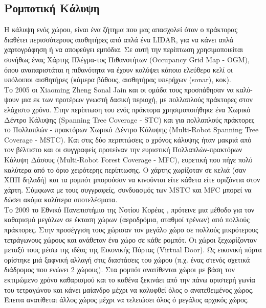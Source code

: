 \subsection{Ρομποτική Κάλυψη}

	Η κάλυψη ενός χώρου, είναι ένα ζήτημα που μας απασχολεί όταν ο πράκτορας διαθέτει περισσότερους αισθητήρες από απλά ένα LIDAR, για να κάνει απλά χαρτογράφηση ή να αποφεύγει εμπόδια. Σε αυτή την περίπτωση χρησιμοποιείται συνήθως ένας Χάρτης Πλέγμα-τος Πιθανοτήτων (Occupancy Grid Map - OGM), όπου αναπαριστάται η πιθανότητα να έχουν καλύψει κάποιο ελεύθερο κελί οι υπόλοιποι αισθητήρες (κάμερα βάθους, αισθητήρας υπερήχων (sonar), κοκ). \\
	
	Το 2005 οι Xiaoming Zheng Sonal Jain \cite{Zheng2005} και οι ομάδα τους προσπάθησαν να καλύ-ψουν μια εκ των προτέρων γνωστή δασική περιοχή, με πολλαπλούς πράκτορες στον ελάχιστο χρόνο. Στην περίπτωση του ενός πράκτορα χρησιμοποιήθηκε ένα Χωρικό Δέντρο Κάλυψης (Spanning Tree Coverage - STC) και για πολλαπλούς πράκτορες το Πολλαπλών - πρακτόρων Χωρικό Δέντρο Κάλυψης (Multi-Robot Spanning Tree Coverage - MSTC). Και στις δύο περιπτώσεις ο χρόνος κάλυψης ήταν μακριά από τον βέλτιστο και οι συγγραφείς προτείναν την ευριστική Πολλαπλών-πρακτόρων Κάλυψη Δάσους (Multi-Robot Forest Coverage - MFC), ευρετική που πήγε πολύ καλύτερα από το όριο χειρότερης περίπτωσης. Ο χάρτης χωρίζοταν σε κελιά (σαν ΧΠΠ δηλαδή) και τα ρομπότ μπορούσαν να κινούνται είτε κάθετα είτε οριζόντια στον χάρτη. Σύμφωνα με τους συγγραφείς, συνδυασμός των MSTC και MFC μπορεί να δώσει ακόμα καλύτερα αποτελέσματα. \\
	
	Το 2009 το Εθνικό Πανεπιστήμιο της Νοτίου Κορέας \cite{Lee2009}, πρότεινε μια μέθοδο για τον καθαρισμό μεγάλων σε έκταση χώρων (αεροδρόμια, σταθμοί τρένων) από πολλούς πράκτορες. Στην προσέγγιση τους χώρισαν τον μεγάλο χώρο σε πολλούς μικρότερους τετράγωνους χώρους και ανάθεταν ένα χώρο σε κάθε ρομπότ. Οι χώροι ξεχωρίζονταν μεταξύ τους μέσω της ιδέας της Εικονικής Πόρτας (Virtual Door). Ως εικονική πόρτα ορίστηκε μιά ξαφνική αλλαγή στις διαστάσεις του χώρου (π.χ. ένας στενός σχετικά διάδρομος που ενώνει 2 χώρους). Στα ρομπότ ανατίθενται χώροι με βάση τον εκτιμώμενο χρόνο καθαρισμού και το καθένα ξεκινάει από την πάνω αριστερή γωνία του τετραγώνου και κάνει μαίανδρο μέχρι να καλυφθεί όλος ο ανατεθειμένος χώρος. Έπειτα ανατίθεται άλλος χώρος μέχρι να τελειώσει όλος ό μεγάλος αρχικός χώρος. \\
	
